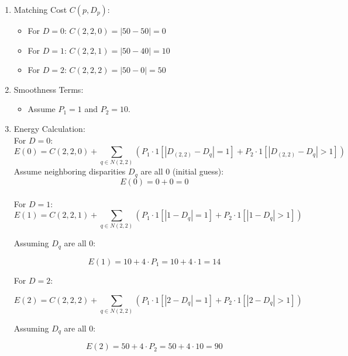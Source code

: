 \documentclass[22pt]{report}
\begin{document}
            \begin{enumerate}
                \item  Matching Cost \(C(p, D_p)\): \begin{itemize} \item For \(D = 0\): \(C(2, 2, 0) = |50 - 50| = 0\) \item For \(D = 1\): \(C(2, 2, 1) = |50 - 40| = 10\) \item For \(D = 2\): \(C(2, 2, 2) = |50 - 0| = 50\) \end{itemize}
                \item Smoothness Terms: \begin{itemize} \item Assume \(P_1 = 1\) and \(P_2 = 10\). \end{itemize}
                \item Energy Calculation:\\ \vspace{15} 
                     For \( D = 0 \): \[ E(0) = C(2,2,0) + \sum_{q \in N(2,2)} \left( P_1 \cdot 1[|D_{(2,2)} - D_q| = 1] + P_2 \cdot 1[|D_{(2,2)} - D_q| > 1] \right) \]
                    Assume neighboring disparities \( D_q \) are all 0 (initial guess):
                     \[ E(0) = 0 + 0 = 0 \] \\
                     For \( D = 1 \):
                        \[
                        E(1) = C(2, 2, 1) + \sum_{q \in N(2,2)} \left( P_1 \cdot 1[|1 - D_q| = 1] + P_2 \cdot 1[|1 - D_q| > 1] \right)
                        \]
                        
                        Assuming \( D_q \) are all 0:
                        
                        \[
                        E(1) = 10 + 4 \cdot P_1 = 10 + 4 \cdot 1 = 14
                        \]
                        
                        For \( D = 2 \):
                        
                        \[
                        E(2) = C(2, 2, 2) + \sum_{q \in N(2,2)} \left( P_1 \cdot 1[|2 - D_q| = 1] + P_2 \cdot 1[|2 - D_q| > 1] \right)
                        \]
                        
                        Assuming \( D_q \) are all 0:
                        
                        \[
                        E(2) = 50 + 4 \cdot P_2 = 50 + 4 \cdot 10 = 90
                        \]

            \end{enumerate}
\end{document}
